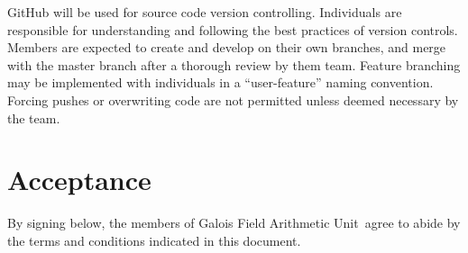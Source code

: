 \documentclass[paper=usletter, fontsize=12pt]{article}
\newcommand{\team}{Galois Field Arithmetic Unit}
\begin{document}
        GitHub will be used for source code version controlling. Individuals are responsible for understanding and following the best practices of version controls. Members are expected to create and develop on their own branches, and merge with the master branch after a thorough review by them team. Feature branching may be implemented with individuals in a “user-feature” naming convention. Forcing pushes or overwriting code are not permitted unless deemed necessary by the team.

    \section{Acceptance}

    By signing below, the members of \team \ agree to abide by the terms and conditions indicated in this document. \\
\end{document}
